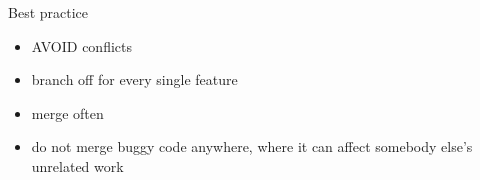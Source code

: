 \begin{frame}{Best practice}


\begin{itemize}
 \item AVOID conflicts
 \item branch off for every single feature
 \item merge often
 \item do not merge buggy code anywhere, where it can affect somebody else's
       unrelated work
\end{itemize}


\end{frame}
